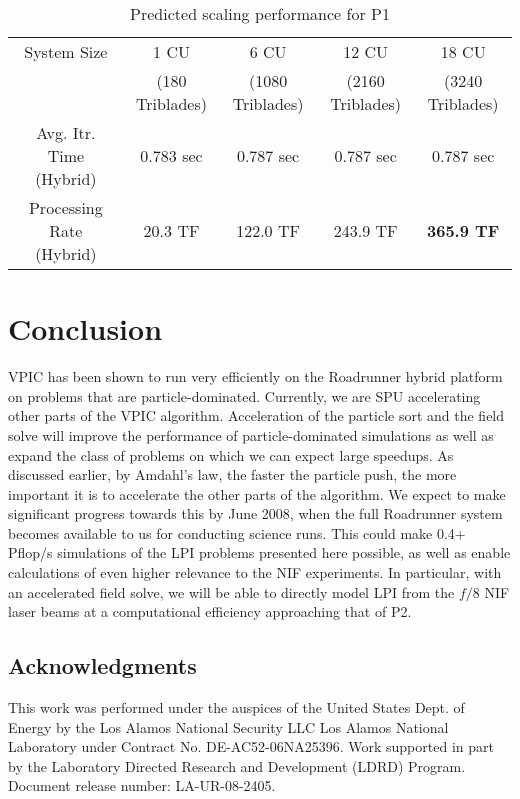 \documentclass[letter,10pt]{article}
\begin{document}
\begin{table}
\begin{center}
\begin{tabular}{c c c c c}
\hline
\hline
 System Size & 1 CU & 6 CU & 12 CU & 18 CU \\
             & (180 Triblades) & (1080 Triblades) & (2160 Triblades) & (3240 Triblades) \\
\hline
Avg. Itr. Time (Hybrid) & 0.783 sec & 0.787 sec & 0.787 sec & 0.787 sec \\
Processing Rate (Hybrid) & 20.3 TF & 122.0 TF & 243.9 TF & \textbf{365.9 TF} \\
\hline
\end{tabular}
\end{center}
\caption{Predicted scaling performance for P1}
\label{tab:p1}
\end{table}


\section{Conclusion}

VPIC has been shown to run very efficiently on the Roadrunner hybrid 
platform on problems that are particle-dominated.  Currently, 
we are SPU accelerating other parts of the VPIC algorithm.
Acceleration of the particle sort and the field solve will improve the
performance of particle-dominated simulations as 
well as expand the class of problems on which we can expect 
large speedups.  As discussed earlier, by Amdahl's law, the faster the 
particle push, the more important it is to accelerate the other
parts of the algorithm.  We expect to make significant progress
towards this by June 2008, when the full Roadrunner system becomes 
available to us for conducting science runs.
This could make 0.4+ Pflop/s simulations of the LPI problems presented
here possible, as well as enable calculations of even higher relevance
to the NIF experiments. In particular, with an accelerated field solve,
we will be able to directly model LPI from the $f/8$ NIF laser beams
at a computational efficiency approaching that of P2. 

\subsection*{Acknowledgments}
This work was performed under the auspices of the United States Dept. 
of Energy by the Los Alamos National Security LLC Los Alamos National
Laboratory under Contract No. DE-AC52-06NA25396.  Work supported in 
part by the Laboratory Directed Research and Development (LDRD) Program.
Document release number: LA-UR-08-2405. 
\end{document}
